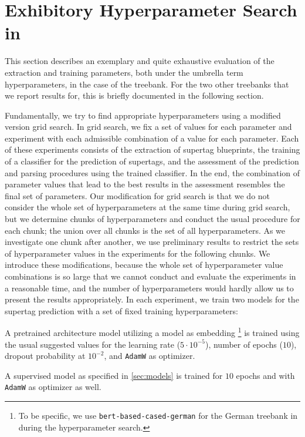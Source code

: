 \documentclass[../../document.tex]{subfiles}
\begin{document}
    \section{Exhibitory Hyperparameter Search in }\label{sec:gridsearch}
    This section describes an exemplary and quite exhaustive evaluation of the extraction and training parameters, both under the umbrella term hyperparameters, in the case of the \negra{} treebank.
    For the two other treebanks that we report results for, this is briefly documented in the following section.
    
    Fundamentally, we try to find appropriate hyperparameters using a modified version grid search.
    In grid search, we fix a set of values for each parameter and experiment with each admissible combination of a value for each parameter.
    Each of these experiments consists of the extraction of supertag blueprints, the training of a classifier for the prediction of supertags, and the assessment of the prediction and parsing procedures using the trained classifier.
    In the end, the combination of parameter values that lead to the best results in the assessment resembles the final set of parameters.
    Our modification for grid search is that we do not consider the whole set of hyperparameters at the same time during grid search, but we determine chunks of hyperparameters and conduct the usual procedure for each chunk; the union over all chunks is the set of all hyperparameters.
    As we investigate one chunk after another, we use preliminary results to restrict the sets of hyperparameter values in the experiments for the following chunks.
    We introduce these modifications, because the whole set of hyperparameter value combinations is so large that we cannot conduct and evaluate the experiments in a reasonable time, and the number of hyperparameters would hardly allow us to present the results appropriately.
    In each experiment, we train two models for the supertag prediction with a set of fixed training hyperparameters:
    \begin{compactitem}
        \item A pretrained architecture model utilizing a  model as embedding \footnote{
            To be specific, we use \texttt{bert-based-cased-german} for the German \negra{} treebank in during the hyperparameter search.
        } is trained using the usual suggested values for the learning rate ($5\cdot 10^{-5}$), number of epochs ($10$), dropout probability at \(10^{-2}\), and \texttt{AdamW} as optimizer.
        \item A supervised model as specified in \cref{sec:models} is trained for $10$ epochs and with \texttt{AdamW} as optimizer as well.
    \end{compactitem}
\end{document}
